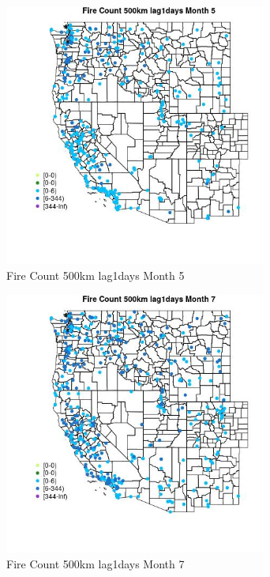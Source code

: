 \begin{figure} 
\centering  
\includegraphics[width=0.77\textwidth]{Code_Outputs/Report_ML_input_PM25_Step4_part_e_de_duplicated_aves_compiled_2019-05-18wNAs_MapObsMo5Fire_Count_500km_lag1days.jpg} 
\caption{\label{fig:Report_ML_input_PM25_Step4_part_e_de_duplicated_aves_compiled_2019-05-18wNAsMapObsMo5Fire_Count_500km_lag1days}Fire Count 500km lag1days Month 5} 
\end{figure} 
 

\clearpage 

\begin{figure} 
\centering  
\includegraphics[width=0.77\textwidth]{Code_Outputs/Report_ML_input_PM25_Step4_part_e_de_duplicated_aves_compiled_2019-05-18wNAs_MapObsMo7Fire_Count_500km_lag1days.jpg} 
\caption{\label{fig:Report_ML_input_PM25_Step4_part_e_de_duplicated_aves_compiled_2019-05-18wNAsMapObsMo7Fire_Count_500km_lag1days}Fire Count 500km lag1days Month 7} 
\end{figure} 
 

